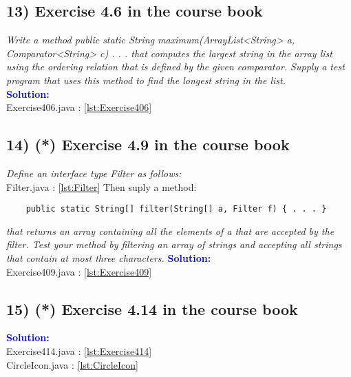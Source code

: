 \documentclass[main.tex]{subfiles}
\begin{document}
\subsection*{13) Exercise 4.6 in the course book}
\textit{Write a method
public static String maximum(ArrayList<String> a, Comparator<String> c) { . . . }
that computes the largest string in the array list using the ordering relation that is defined by the
given comparator. Supply a test program that uses this method to find the longest string in the
list.}\\
\indent \textbf{\textcolor{blue}{Solution:}} \\
Exercise406.java : \ref{lst:Exercise406}

\subsection*{14) (*) Exercise 4.9 in the course book}
\textit{Define an interface type Filter as follows:
}\\
Filter.java : \ref{lst:Filter}
Then suply a method:
\begin{verbatim}
    public static String[] filter(String[] a, Filter f) { . . . }   
\end{verbatim}
\textit{that returns an array containing all the elements of a that are accepted by the filter. Test your
method by filtering an array of strings and accepting all strings that contain at most three characters.
}
\indent \textbf{\textcolor{blue}{Solution:}} \\
Exercise409.java : \ref{lst:Exercise409}

\subsection*{15) (*) Exercise 4.14 in the course book}
\indent \textbf{\textcolor{blue}{Solution:}} \\
Exercise414.java : \ref{lst:Exercise414}\\
CircleIcon.java : \ref{lst:CircleIcon}\\
\end{document}
